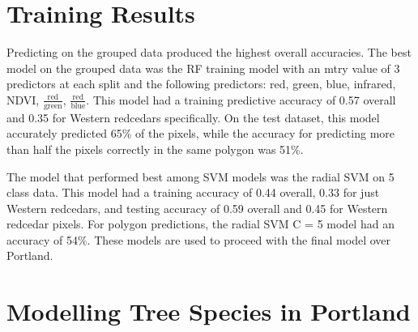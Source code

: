 \documentclass[12pt,twoside]{reedthesis}
\begin{document}
\hypertarget{training-results}{%
\section{Training Results}\label{training-results}}

Predicting on the grouped data produced the highest overall accuracies. The best model on the grouped data was the RF training model with an mtry value of 3 predictors at each split and the following predictors: red, green, blue, infrared, NDVI, \(\frac{\mbox{red}}{\mbox{green}}\), \(\frac{\mbox{red}}{\mbox{blue}}\). This model had a training predictive accuracy of 0.57 overall and 0.35 for Western redcedars specifically. On the test dataset, this model accurately predicted 65\% of the pixels, while the accuracy for predicting more than half the pixels correctly in the same polygon was 51\%.

The model that performed best among SVM models was the radial SVM on 5 class data. This model had a training accuracy of 0.44 overall, 0.33 for just Western redcedars, and testing accuracy of 0.59 overall and 0.45 for Western redcedar pixels. For polygon predictions, the radial SVM C = 5 model had an accuracy of 54\%. These models are used to proceed with the final model over Portland.

\hypertarget{modelling-tree-species-in-portland}{%
\section{Modelling Tree Species in Portland}\label{modelling-tree-species-in-portland}}
\end{document}
